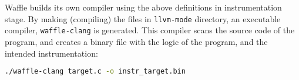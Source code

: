 

Waffle builds its own compiler using the above definitions in instrumentation stage. By making (compiling) the files in \texttt{llvm-mode} directory, an executable compiler, \texttt{waffle-clang} is generated. This compiler scans the source code of the program, and creates a binary file with the logic of the program, and the intended instrumentation:

\begin{lstlisting}[language=bash,style=CommandStyle,label={lst:wafl-clang}]
  ./waffle-clang target.c -o instr_target.bin
\end{lstlisting}